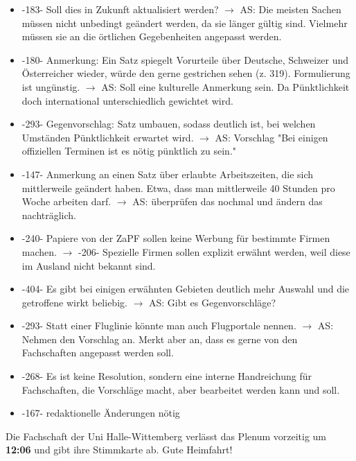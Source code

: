     \begin{itemize}
      \item -183- Soll dies in Zukunft aktualisiert werden? $\rightarrow$ AS: Die meisten Sachen müssen nicht unbedingt geändert werden, da sie länger gültig sind. Vielmehr müssen sie an die örtlichen Gegebenheiten angepasst werden.
      \item -180- Anmerkung: Ein Satz spiegelt Vorurteile über Deutsche, Schweizer und Österreicher wieder, würde den gerne gestrichen sehen (z. 319). Formulierung ist ungünstig. $\rightarrow$ AS: Soll eine kulturelle Anmerkung sein. Da Pünktlichkeit doch international unterschiedlich gewichtet wird.
      \item -293- Gegenvorschlag: Satz umbauen, sodass deutlich ist, bei welchen Umständen Pünktlichkeit erwartet wird. $\rightarrow$ AS: Vorschlag "Bei einigen offiziellen Terminen ist es nötig pünktlich zu sein."
      \item -147- Anmerkung an einen Satz über erlaubte Arbeitszeiten, die sich mittlerweile geändert haben. Etwa, dass man mittlerweile 40 Stunden pro Woche arbeiten darf. $\rightarrow$ AS: überprüfen das nochmal und ändern das nachträglich.
      \item -240- Papiere von der ZaPF sollen keine Werbung für bestimmte Firmen machen. $\rightarrow$ -206- Spezielle Firmen sollen explizit erwähnt werden, weil diese im Ausland nicht bekannt sind.
      \item -404- Es gibt bei einigen erwähnten Gebieten deutlich mehr Auswahl und die getroffene wirkt beliebig. $\rightarrow$ AS: Gibt es Gegenvorschläge?
      \item -293- Statt einer Fluglinie könnte man auch Flugportale nennen. $\rightarrow$ AS: Nehmen den Vorschlag an. Merkt aber an, dass es gerne von den Fachschaften angepasst werden soll.
      \item -268- Es ist keine Resolution, sondern eine interne Handreichung für Fachschaften, die Vorschläge macht, aber bearbeitet werden kann und soll.
      \item -167- redaktionelle Änderungen nötig
    \end{itemize}

    \begin{info}{}
      Die Fachschaft der Uni Halle-Wittemberg verlässt das Plenum vorzeitig um \textbf{12:06} und gibt ihre Stimmkarte ab. Gute Heimfahrt!
    \end{info}

